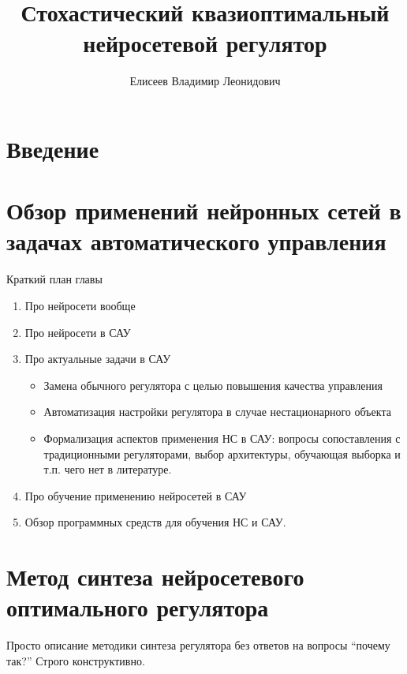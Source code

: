 \documentclass[12pt]{rusthesis}
\title{Стохастический квазиоптимальный нейросетевой регулятор}
\author{Елисеев Владимир Леонидович}
\begin{document}

\setcounter{tocdepth}{4}\tableofcontents

\chapter*{Введение}

%

\chapter{Обзор применений нейронных сетей в задачах автоматического управления}
\centerline{Краткий план главы}
\begin{enumerate}
\item Про нейросети вообще
\item Про нейросети в САУ
\item Про актуальные задачи в САУ
  \begin{itemize}
  \item Замена обычного регулятора с целью повышения качества управления
  \item Автоматизация настройки регулятора в случае нестационарного объекта
  \item Формализация аспектов применения НС в САУ: вопросы
    сопоставления с традиционными регуляторами, выбор архитектуры,
    обучающая выборка и т.п. чего нет в литературе.
  \end{itemize}
\item Про обучение применению нейросетей в САУ
\item Обзор программных средств для обучения НС и САУ.
\end{enumerate}

%

\chapter{Метод синтеза нейросетевого оптимального регулятора}
Просто описание методики синтеза регулятора без ответов на вопросы
``почему так?''  Строго конструктивно.
%
\end{document}
